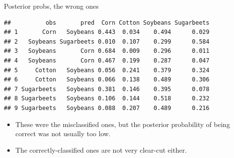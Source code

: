 \documentclass[ignorenonframetext,]{beamer}
\newenvironment{Shaded}{\begin{snugshade}}{\end{snugshade}}
\newcommand{\DataTypeTok}[1]{\textcolor[rgb]{0.13,0.29,0.53}{#1}}
\newcommand{\DecValTok}[1]{\textcolor[rgb]{0.00,0.00,0.81}{#1}}
\newcommand{\KeywordTok}[1]{\textcolor[rgb]{0.13,0.29,0.53}{\textbf{#1}}}
\newcommand{\NormalTok}[1]{#1}
\newcommand{\OperatorTok}[1]{\textcolor[rgb]{0.81,0.36,0.00}{\textbf{#1}}}
\newcommand{\StringTok}[1]{\textcolor[rgb]{0.31,0.60,0.02}{#1}}
\begin{document}
\begin{frame}[fragile]{Posterior probs, the wrong ones}
\protect\hypertarget{posterior-probs-the-wrong-ones}{}

\footnotesize

\begin{Shaded}
\end{Shaded}

\begin{verbatim}
##          obs       pred  Corn Cotton Soybeans Sugarbeets
## 1       Corn   Soybeans 0.443  0.034    0.494      0.029
## 2   Soybeans Sugarbeets 0.010  0.107    0.299      0.584
## 3   Soybeans       Corn 0.684  0.009    0.296      0.011
## 4   Soybeans       Corn 0.467  0.199    0.287      0.047
## 5     Cotton   Soybeans 0.056  0.241    0.379      0.324
## 6     Cotton   Soybeans 0.066  0.138    0.489      0.306
## 7 Sugarbeets   Soybeans 0.381  0.146    0.395      0.078
## 8 Sugarbeets   Soybeans 0.106  0.144    0.518      0.232
## 9 Sugarbeets   Soybeans 0.088  0.207    0.489      0.216
\end{verbatim}

\normalsize

\begin{itemize}
\item
  These were the misclassified ones, but the posterior probability of
  being correct was not usually too low.
\item
  The correctly-classified ones are not very clear-cut either.
\end{itemize}

\end{frame}
\end{document}
